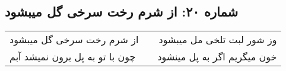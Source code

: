 \begin{center}
\section*{شماره ۲۰: از شرم رخت سرخی گل میبشود}
\label{sec:020}
\begin{longtable}{l p{0.5cm} r}
از شرم رخت سرخی گل میبشود
&&
وز شور لبت تلخی مل میبشود
\\
چون با تو به پل برون نمیشد آبم
&&
خون میگریم اگر به پل مینشود
\\
\end{longtable}
\end{center}
